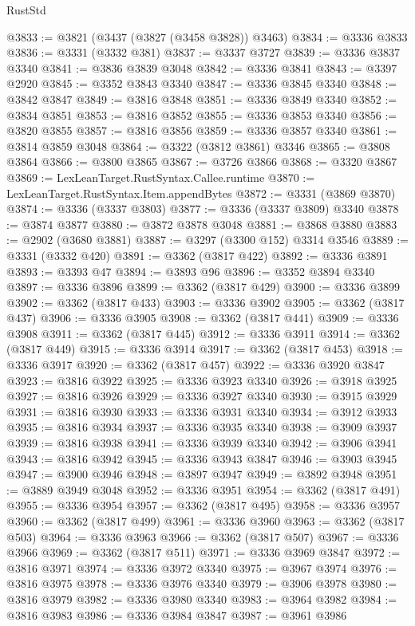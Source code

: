 \begin{lexlean}{RustStd}
\begin{coremodule}
@3833 := @3821 (@3437 (@3827 (@3458 @3828)) @3463)
@3834 := @3336 @3833
@3836 := @3331 (@3332 @381)
@3837 := @3337 @3727
@3839 := @3336 @3837 @3340
@3841 := @3836 @3839 @3048
@3842 := @3336 @3841
@3843 := @3397 @2920
@3845 := @3352 @3843 @3340
@3847 := @3336 @3845 @3340
@3848 := @3842 @3847
@3849 := @3816 @3848
@3851 := @3336 @3849 @3340
@3852 := @3834 @3851
@3853 := @3816 @3852
@3855 := @3336 @3853 @3340
@3856 := @3820 @3855
@3857 := @3816 @3856
@3859 := @3336 @3857 @3340
@3861 := @3814 @3859 @3048
@3864 := @3322 (@3812 @3861) @3346
@3865 := @3808 @3864
@3866 := @3800 @3865
@3867 := @3726 @3866
@3868 := @3320 @3867
@3869 := LexLeanTarget.RustSyntax.Callee.runtime
@3870 := LexLeanTarget.RustSyntax.Item.appendBytes
@3872 := @3331 (@3869 @3870)
@3874 := @3336 (@3337 @3803)
@3877 := @3336 (@3337 @3809) @3340
@3878 := @3874 @3877
@3880 := @3872 @3878 @3048
@3881 := @3868 @3880
@3883 := @2902 (@3680 @3881)
@3887 := @3297 (@3300 @152) @3314 @3546
@3889 := @3331 (@3332 @420)
@3891 := @3362 (@3817 @422)
@3892 := @3336 @3891
@3893 := @3393 @47
@3894 := @3893 @96
@3896 := @3352 @3894 @3340
@3897 := @3336 @3896
@3899 := @3362 (@3817 @429)
@3900 := @3336 @3899
@3902 := @3362 (@3817 @433)
@3903 := @3336 @3902
@3905 := @3362 (@3817 @437)
@3906 := @3336 @3905
@3908 := @3362 (@3817 @441)
@3909 := @3336 @3908
@3911 := @3362 (@3817 @445)
@3912 := @3336 @3911
@3914 := @3362 (@3817 @449)
@3915 := @3336 @3914
@3917 := @3362 (@3817 @453)
@3918 := @3336 @3917
@3920 := @3362 (@3817 @457)
@3922 := @3336 @3920 @3847
@3923 := @3816 @3922
@3925 := @3336 @3923 @3340
@3926 := @3918 @3925
@3927 := @3816 @3926
@3929 := @3336 @3927 @3340
@3930 := @3915 @3929
@3931 := @3816 @3930
@3933 := @3336 @3931 @3340
@3934 := @3912 @3933
@3935 := @3816 @3934
@3937 := @3336 @3935 @3340
@3938 := @3909 @3937
@3939 := @3816 @3938
@3941 := @3336 @3939 @3340
@3942 := @3906 @3941
@3943 := @3816 @3942
@3945 := @3336 @3943 @3847
@3946 := @3903 @3945
@3947 := @3900 @3946
@3948 := @3897 @3947
@3949 := @3892 @3948
@3951 := @3889 @3949 @3048
@3952 := @3336 @3951
@3954 := @3362 (@3817 @491)
@3955 := @3336 @3954
@3957 := @3362 (@3817 @495)
@3958 := @3336 @3957
@3960 := @3362 (@3817 @499)
@3961 := @3336 @3960
@3963 := @3362 (@3817 @503)
@3964 := @3336 @3963
@3966 := @3362 (@3817 @507)
@3967 := @3336 @3966
@3969 := @3362 (@3817 @511)
@3971 := @3336 @3969 @3847
@3972 := @3816 @3971
@3974 := @3336 @3972 @3340
@3975 := @3967 @3974
@3976 := @3816 @3975
@3978 := @3336 @3976 @3340
@3979 := @3906 @3978
@3980 := @3816 @3979
@3982 := @3336 @3980 @3340
@3983 := @3964 @3982
@3984 := @3816 @3983
@3986 := @3336 @3984 @3847
@3987 := @3961 @3986

\end{coremodule}
\end{lexlean}
